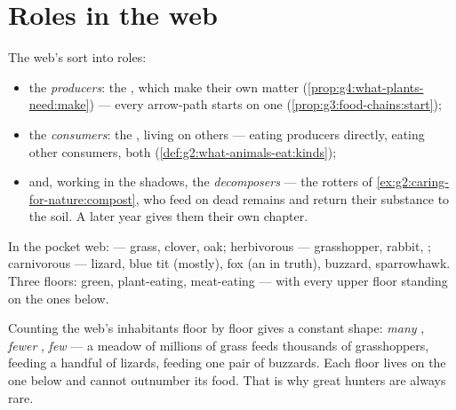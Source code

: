 \section{Roles in the web}

\begin{definition}\label{def:g5:food-webs:roles}
The web's  sort into roles:
\begin{itemize}
  \item the \emph{producers}: the ,
        which make their own matter
        (\cref{prop:g4:what-plants-need:make}) --- every
        arrow-path starts on one
        (\cref{prop:g3:food-chains:start});
  \item the \emph{consumers}: the ,
        living on others ---  eating producers
        directly,  eating other consumers,
         both (\cref{def:g2:what-animals-eat:kinds});
  \item and, working in the shadows, the
        \emph{decomposers} --- the rotters
        of \cref{ex:g2:caring-for-nature:compost}, who feed
        on dead remains and return their substance to the
        soil. A later year gives them their own chapter.
\end{itemize}
\end{definition}

\begin{example}\label{ex:g5:food-webs:sorting}
In the pocket web:  --- grass, clover, oak;
herbivorous  --- grasshopper, rabbit, ;
carnivorous  --- lizard, blue tit (mostly), fox
(an  in truth), buzzard, sparrowhawk. Three floors:
green, plant-eating, meat-eating --- with every upper floor
standing on the ones below.
\end{example}

\begin{proposition}\label{prop:g5:food-webs:pyramid}
Counting the web's inhabitants floor by floor gives a
constant shape: \emph{many} , \emph{fewer}
, \emph{few}  --- a meadow of millions
of grass  feeds thousands of grasshoppers, feeding a
handful of lizards, feeding one pair of buzzards. Each floor
lives on the one below and cannot outnumber its food. That
is why great hunters are always rare.
\end{proposition}
\admitted

